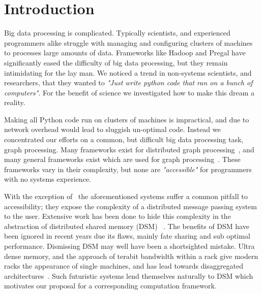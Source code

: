 \section{Introduction}
\label{sec:intro}

Big data processing is complicated. Typically scientists, and
experienced programmers alike struggle with managing and configuring
clusters of machines to processes large amounts of data. Frameworks
like Hadoop and Pregal have significantly eased the difficulty of big
data processing, but they remain intimidating for the lay man. We
noticed a trend in non-systems scientists, and researchers, that they
wanted to \textit{"Just write python code that ran on a bunch of
computers"}. For the benefit of science we investigated how to make
this dream a reality.

Making all Python code run on clusters of machines is impractical, and
due to network overhead would lead to sluggish un-optimal code. Instead
we concentrated our efforts on a common, but difficult big data
processing task, graph processing. Many frameworks exist for
distributed graph
processing~\cite{Malewicz:2010:PSL:1807167.1807184,Ching:2015:OTE:2824032.2824077,Kyrola:2012:GLG:2387880.2387884,Low:2012:DGF:2212351.2212354,Xin:2013:GRD:2484425.2484427,Gonzalez:2012:PDG:2387880.2387883},
and many general frameworks exist which are used for graph
processing~\cite{Vavilapalli:2013:AHY:2523616.2523633,Zaharia:2012:RDD:2228298.2228301,Isard:2007:DDD:1272996.1273005,Murray:2013:NTD:2517349.2522738}.
These frameworks vary in their complexity, but none are
\textit{"accessible"} for programmers with no systems experience.

With the exception of~\cite{Kyrola:2012:GLG:2387880.2387884} the
aforementioned systems suffer a common pitfall to accessibility; they
expose the complexity of a distributed message passing system to the
user. Extensive work has been done to hide this complexity in the
abstraction of distributed shared memory (DSM)
~\cite{Keleher:1994:TDS:1267074.1267084,Power:2010:PBF:1924943.1924964,Morin:2004:KDP:1111682.1111729,Haddad:2001:MCL:374794.374800,Huang06vodca:view-oriented}.
The benefits of DSM have been ignored in recent years due its flaws,
mainly fate sharing and sub optimal performance. Dismissing DSM may
well have been a shortsighted mistake. Ultra dense memory, and the
approach of terabit bandwidth within a rack give modern racks the
appearance of single machines, and has lead towards disaggregated
architectures~\cite{facebook-rack,machine,intel-rsa,seamicro,Han:2013:NSR:2535771.2535778}.
Such futuristic systems lend themselves naturally to DSM which
motivates our proposal for a corresponding computation framework.

